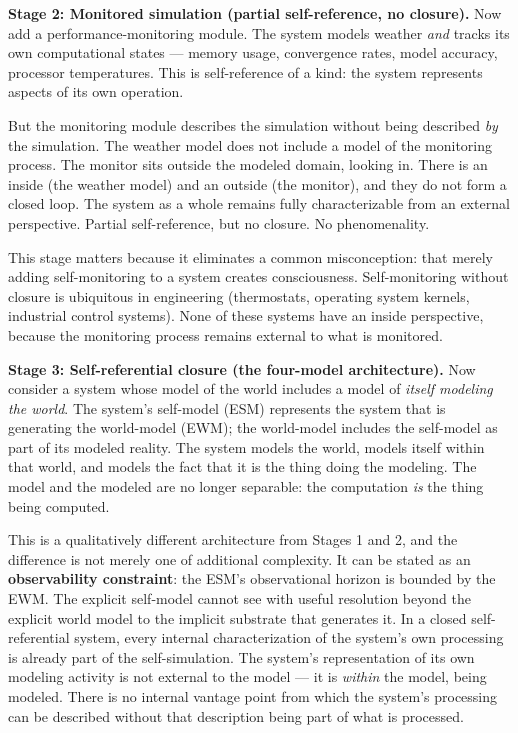 \documentclass[12pt]{article}
\begin{document}
{\textbf{Stage 2: Monitored simulation (partial self-reference, no closure).} Now add a performance-monitoring module. The system models weather \emph{and} tracks its own computational states --- memory usage, convergence rates, model accuracy, processor temperatures. This is self-reference of a kind: the system represents aspects of its own operation.

But the monitoring module describes the simulation without being described \emph{by} the simulation. The weather model does not include a model of the monitoring process. The monitor sits outside the modeled domain, looking in. There is an inside (the weather model) and an outside (the monitor), and they do not form a closed loop. The system as a whole remains fully characterizable from an external perspective. Partial self-reference, but no closure. No phenomenality.

This stage matters because it eliminates a common misconception: that merely adding self-monitoring to a system creates consciousness. Self-monitoring without closure is ubiquitous in engineering (thermostats, operating system kernels, industrial control systems). None of these systems have an inside perspective, because the monitoring process remains external to what is monitored.

\textbf{Stage 3: Self-referential closure (the four-model architecture).} Now consider a system whose model of the world includes a model of \emph{itself modeling the world}. The system's self-model (ESM) represents the system that is generating the world-model (EWM); the world-model includes the self-model as part of its modeled reality. The system models the world, models itself within that world, and models the fact that it is the thing doing the modeling. The model and the modeled are no longer separable: the computation \emph{is} the thing being computed.

This is a qualitatively different architecture from Stages 1 and 2, and the difference is not merely one of additional complexity. It can be stated as an \textbf{observability constraint}: the ESM's observational horizon is bounded by the EWM. The explicit self-model cannot see with useful resolution beyond the explicit world model to the implicit substrate that generates it. In a closed self-referential system, every internal characterization of the system's own processing is already part of the self-simulation. The system's representation of its own modeling activity is not external to the model --- it is \emph{within} the model, being modeled. There is no internal vantage point from which the system's processing can be described without that description being part of what is processed.

}
\end{document}
